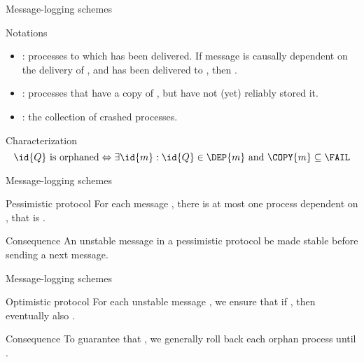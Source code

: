   \begin{slide}{Message-logging schemes}
    \begin{block}{Notations}
      \begin{itemize}
      \item {}: processes to which  has been delivered. If message  is causally dependent
        on the delivery of , and  has been delivered to , then .
      \item {}: processes that have a copy of , but have not (yet) reliably stored it.
      \item \FAIL: the collection of crashed processes.
      \end{itemize}
    \end{block}
    \begin{alertblock}{Characterization}
      \[ 
      \id{Q} \mbox{\ is orphaned} \Leftrightarrow \exists \id{m}: \id{Q} \in \DEP{m} \mbox{\ and\ } \COPY{m}
      \subseteq \FAIL
      \]
    \end{alertblock}
  \end{slide}
  \begin{slide}{Message-logging schemes}
    \begin{block}{Pessimistic protocol} 
      For each  message , there is at most one process dependent on , that is
      .
    \end{block}
    \begin{alertblock}{Consequence} 
      An unstable message in a pessimistic protocol  be made stable before sending a next message.
    \end{alertblock}
  \end{slide}
  \begin{slide}{Message-logging schemes}
    \begin{block}{Optimistic protocol} 
      For each unstable message , we ensure that if , then eventually
      also .
    \end{block}
    \begin{alertblock}{Consequence} 
      To guarantee that , we generally roll back each orphan process 
      until .
    \end{alertblock}
  \end{slide}
